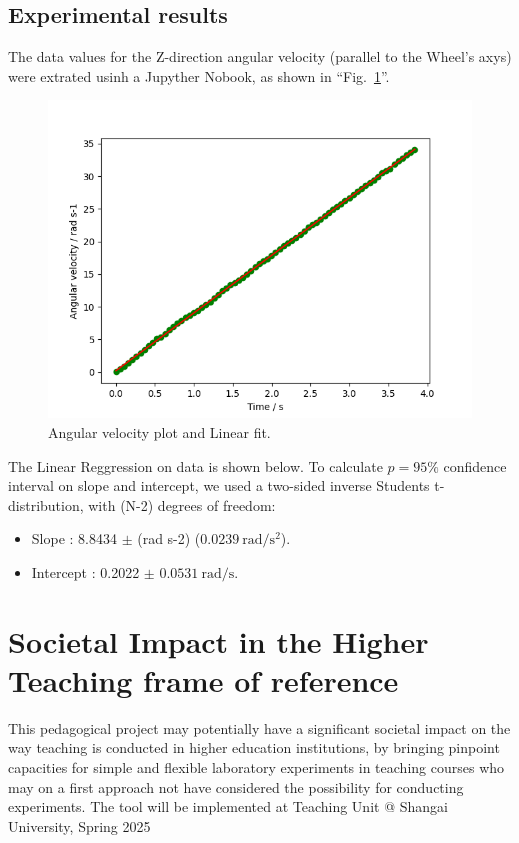 \documentclass[conference]{IEEEtran}
\begin{document}
\subsection{Experimental results}
The data values for the Z-direction angular velocity (parallel to the Wheel's axys) were extrated usinh a Jupyther Nobook, as shown in ``Fig.~\ref{figAngleVel}''. 

\begin{figure}[htbp]
\centerline{\includegraphics[width=.8\columnwidth]{AngAccel.png}}
\caption{Angular velocity plot and Linear fit.}
\label{figAngleVel}
\end{figure}

The Linear Reggression on data is shown below. 
To calculate $p=95\%$ confidence interval on slope and intercept, we used a two-sided inverse Students t-distribution, with (N-2) degrees of freedom:

\begin{itemize}
    \item Slope : 8.8434 $\pm$ (rad s-2) ($\SI{0.0239}{\radian\per\second\squared}$).

    \item Intercept : 0.2022 $\pm$ $\SI{0.0531}{\radian\per\second}$.
\end{itemize}
  
\section{Societal Impact in the Higher Teaching frame of reference}
This pedagogical project may potentially have a significant societal impact on the way teaching is conducted in higher education institutions, 
by bringing pinpoint capacities for simple and flexible laboratory experiments in teaching courses who may on a first approach not have considered the possibility for conducting experiments.
The tool will be implemented at Teaching Unit @ Shangai University, Spring 2025
\end{document}
